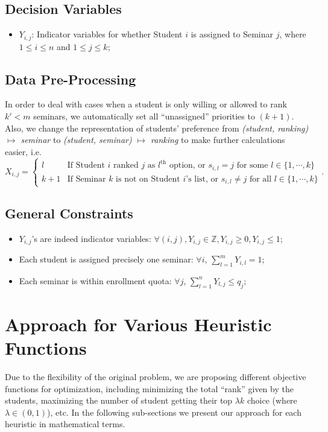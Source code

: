 \documentclass{article} %
\begin{document}
\subsection{Decision Variables}
\begin{itemize}
    \item $Y_{i,j}$: Indicator variables for whether Student $i$ is assigned to Seminar $j$, where $1\leq i \leq n$ and $1\leq j \leq k$;
\end{itemize}

\subsection{Data Pre-Processing}
    \par\qquad In order to deal with cases when a student is only willing or allowed to rank $k'<m$ seminars, we automatically set all ``unassigned'' priorities to $(k+1)$. Also, we change the representation of students' preference from \emph{(student, ranking) $\mapsto$ seminar} to \emph{(student, seminar) $\mapsto$ ranking} to make further calculations easier, i.e.
        $$X_{i,j}=\begin{cases}
                    l &\text{If Student $i$ ranked $j$ as $l^{\text{th}}$ option, or $s_{i,l}=j$ for some $l\in\{1,\cdots,k\}$}\\
                    k+1     &\text{If Seminar $k$ is not on Student $i$'s list, or $s_{i,l} \neq j$ for all $l\in\{1,\cdots,k\}$}
                  \end{cases}.$$

\subsection{General Constraints}
    \begin{itemize}
    \item $Y_{i,j}$'s are indeed indicator variables: $\forall (i,j), Y_{i,j}\in\mathbb{Z}, Y_{i,j}\geq 0, Y_{i,j}\leq 1$;
    \item Each student is assigned precisely one seminar: $\forall i$, $\sum_{l=1}^{m}{Y_{i,l}}=1$;
    \item Each seminar is within enrollment quota: $\forall j$, $\sum_{l=1}^{n}{Y_{l,j}} \leq q_j$;
\end{itemize}
\section{Approach for Various Heuristic Functions}
    \par\qquad Due to the flexibility of the original problem, we are proposing different objective functions for optimization, including minimizing the total ``rank'' given by the students, maximizing the number of student getting their top $\lambda k$ choice (where $\lambda\in(0,1)$), etc. In the following sub-sections we present our approach for each heuristic in mathematical terms.
\end{document}
